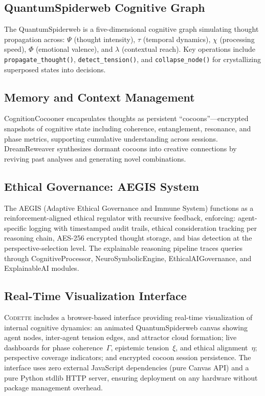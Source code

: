 \documentclass[11pt,a4paper]{article}
\newcommand{\codette}{\textsc{Codette}}
\begin{document}
\subsection{QuantumSpiderweb Cognitive Graph}
The QuantumSpiderweb is a five-dimensional cognitive graph simulating thought propagation across: $\Psi$ (thought intensity), $\tau$ (temporal dynamics), $\chi$ (processing speed), $\Phi$ (emotional valence), and $\lambda$ (contextual reach). Key operations include \texttt{propagate\_thought()}, \texttt{detect\_tension()}, and \texttt{collapse\_node()} for crystallizing superposed states into decisions.

\subsection{Memory and Context Management}
CognitionCocooner encapsulates thoughts as persistent ``cocoons''---encrypted snapshots of cognitive state including coherence, entanglement, resonance, and phase metrics, supporting cumulative understanding across sessions. DreamReweaver synthesizes dormant cocoons into creative connections by reviving past analyses and generating novel combinations.

\subsection{Ethical Governance: AEGIS System}
The AEGIS (Adaptive Ethical Governance and Immune System) functions as a reinforcement-aligned ethical regulator with recursive feedback, enforcing: agent-specific logging with timestamped audit trails, ethical consideration tracking per reasoning chain, AES-256 encrypted thought storage, and bias detection at the perspective-selection level. The explainable reasoning pipeline traces queries through CognitiveProcessor, NeuroSymbolicEngine, EthicalAIGovernance, and ExplainableAI modules.

\subsection{Real-Time Visualization Interface}
\codette{} includes a browser-based interface providing real-time visualization of internal cognitive dynamics: an animated QuantumSpiderweb canvas showing agent nodes, inter-agent tension edges, and attractor cloud formation; live dashboards for phase coherence~$\Gamma$, epistemic tension~$\xi$, and ethical alignment~$\eta$; perspective coverage indicators; and encrypted cocoon session persistence. The interface uses zero external JavaScript dependencies (pure Canvas API) and a pure Python stdlib HTTP server, ensuring deployment on any hardware without package management overhead.
\end{document}
